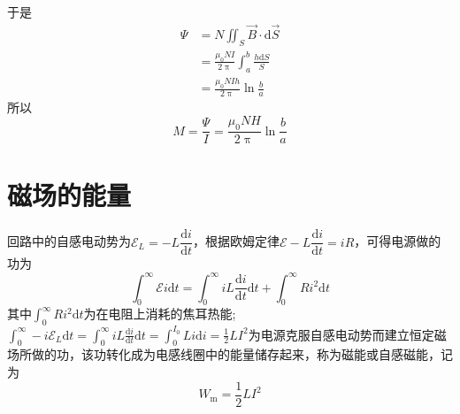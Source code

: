 \documentclass[12pt]{article}
\newcommand{\rmd}{\mathrm{d}}
\newcommand{\deriv}[2]{\frac{\rmd #1}{\rmd #2}}
\newcommand{\dderiv}[2]{\dfrac{\rmd #1}{\rmd #2}}
\begin{document}
于是
\begin{equation*}
    \begin{aligned}
        \varPsi &= N \iint_S \overrightarrow{B} \cdot \rmd \overrightarrow{S} \\
        &= \frac{\mu_0 NI}{2 \uppi} \int_{a}^{b} \frac{h \rmd S}{S} \\
        &= \frac{\mu_0 NIh}{2 \uppi} \ln \frac{b}{a}
    \end{aligned}
\end{equation*}
所以
\begin{equation*}
    M = \frac{\varPsi}{I} = \frac{\mu_0 NH}{2 \uppi} \ln \frac{b}{a}
\end{equation*}

\section{磁场的能量}

回路中的自感电动势为\(\mathscr{E}_L = -L\dderiv{i}{t}\)，根据欧姆定律\(\mathscr{E} - L \dderiv{i}{t} = i R\)，可得电源做的功为
\begin{equation}
    \int_{0}^{\infty} \mathscr{E} i \rmd t = \int_{0}^{\infty} i L\deriv{i}{t} \rmd t + \int_{0}^{\infty} R i^2 \rmd t
\end{equation}
其中$\int_0^{\infty} R i^2 \rmd t$为在电阻上消耗的焦耳热能; $\int_0^{\infty}-i \mathscr{E}_L \rmd t=\int_0^{\infty} i L \deriv{i}{t} \rmd t=\int_0^{I_0} L i \rmd i=\frac{1}{2} L I^2$为电源克服自感电动势而建立恒定磁场所做的功，该功转化成为电感线圈中的能量储存起来，称为磁能或自感磁能，记为
\begin{equation}
W_{\mathrm{m}}=\frac{1}{2} L I^2
\label{14-30}
\end{equation}
\end{document}
